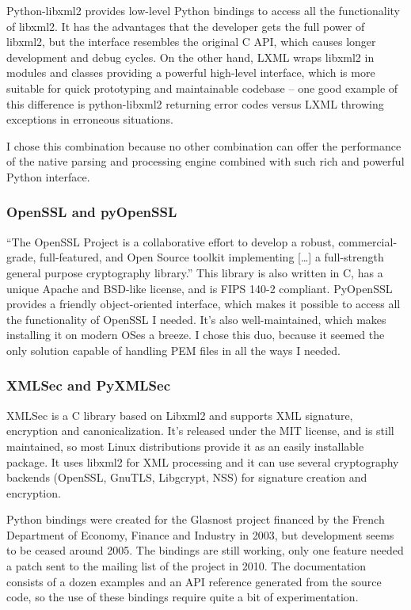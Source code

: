 \label{lxml}
Python-libxml2 provides low-level Python bindings to access all the functionality of libxml2. It has the advantages that the developer gets the full power of libxml2, but the interface resembles the original C API, which causes longer development and debug cycles. On the other hand, LXML\cite{lxml-homepage} wraps libxml2 in modules and classes providing a powerful high-level interface, which is more suitable for quick prototyping and maintainable codebase -- one good example of this difference is python-libxml2 returning error codes versus LXML throwing exceptions in erroneous situations.

I chose this combination because no other combination can offer the performance of the native parsing and processing engine combined with such rich and powerful Python interface.

\subsubsection{OpenSSL and pyOpenSSL}

``The OpenSSL Project is a collaborative effort to develop a robust, commercial-grade, full-featured, and Open Source toolkit implementing [\ldots] a full-strength general purpose cryptography library.''\cite{openssl-homepage} This library is also written in C, has a unique Apache and BSD-like license, and is FIPS 140-2 compliant. PyOpenSSL provides a friendly object-oriented interface, which makes it possible to access all the functionality of OpenSSL I needed. It's also well-maintained, which makes installing it on modern OSes a breeze. I chose this duo, because it seemed the only solution capable of handling PEM files in all the ways I needed.

\subsubsection{XMLSec and PyXMLSec}

XMLSec is a C library based on Libxml2 and supports XML signature, encryption and canonicalization.\cite{xmlsec-homepage} It's released under the MIT license, and is still maintained, so most Linux distributions provide it as an easily installable package. It uses libxml2 for XML processing and it can use several cryptography backends (OpenSSL, GnuTLS, Libgcrypt, NSS) for signature creation and encryption.

Python bindings were created for the Glasnost project financed by the French Department of Economy, Finance and Industry in 2003, but development seems to be ceased around 2005. The bindings are still working, only one feature needed a patch sent to the mailing list of the project in 2010. The documentation consists of a dozen examples and an API reference generated from the source code, so the use of these bindings require quite a bit of experimentation.


